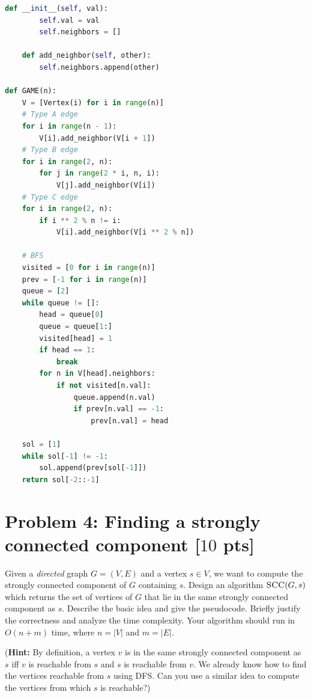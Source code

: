 \documentclass[11pt,twoside]{article}
\newcommand{\problem}[1]{\section*{Problem #1}}
\newenvironment{solution}{{\par\noindent\it Solution.}}{}
\begin{document}
\begin{solution}
\begin{lstlisting}[language=Python]
    def __init__(self, val):
        self.val = val
        self.neighbors = []

    def add_neighbor(self, other):
        self.neighbors.append(other)

def GAME(n):
    V = [Vertex(i) for i in range(n)]
    # Type A edge
    for i in range(n - 1):
        V[i].add_neighbor(V[i + 1])
    # Type B edge
    for i in range(2, n):
        for j in range(2 * i, n, i):
            V[j].add_neighbor(V[i])
    # Type C edge
    for i in range(2, n):
        if i ** 2 % n != i:
            V[i].add_neighbor(V[i ** 2 % n])

    # BFS
    visited = [0 for i in range(n)]
    prev = [-1 for i in range(n)]
    queue = [2]
    while queue != []:
        head = queue[0]
        queue = queue[1:]
        visited[head] = 1
        if head == 1:
            break
        for n in V[head].neighbors:
            if not visited[n.val]:
                queue.append(n.val)
                if prev[n.val] == -1:
                    prev[n.val] = head 

    sol = [1]
    while sol[-1] != -1:
        sol.append(prev[sol[-1]])
    return sol[-2::-1]
\end{lstlisting}
\end{solution}

\problem{4: Finding a strongly connected component [$10$ pts]}
Given a \textit{directed} graph $G = (V,E)$ and a vertex $s \in V$, we want to compute the strongly connected component of $G$ containing $s$.
Design an algorithm $\textsc{SCC}(G,s)$ which returns the set of vertices of $G$ that lie in the same strongly connected component as $s$.
Describe the basic idea and give the pseudocode.
Briefly justify the correctness and analyze the time complexity.
Your algorithm should run in $O(n+m)$ time, where $n = |V|$ and $m = |E|$.

(\textbf{Hint:} By definition, a vertex $v$ is in the same strongly connected component as $s$ iff $v$ is reachable from $s$ and $s$ is reachable from $v$. We already know how to find the vertices reachable from $s$ using DFS. Can you use a similar idea to compute the vertices from which $s$ is reachable?)
\end{document}
